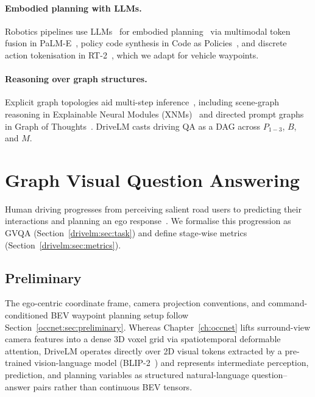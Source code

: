 \paragraph{Embodied planning with LLMs.}
Robotics pipelines use LLMs~\cite{touvron2023llama,floridi2020gpt,kojima2022large} for embodied planning~\cite{brohan2023can,huang2022inner,zitkovich2023rt2,driess2023palme,liang2023code,karamcheti2023voltron,rana2023sayplan} via multimodal token fusion in PaLM-E~\cite{driess2023palme}, policy code synthesis in Code as Policies~\cite{liang2023code}, and discrete action tokenisation in RT-2~\cite{zitkovich2023rt2}, which we adapt for vehicle waypoints.

\paragraph{Reasoning over graph structures.}
Explicit graph topologies aid multi-step inference~\cite{chen2020review,shi2019scenegraph,besta2023got,chen2019graph}, including scene-graph reasoning in Explainable Neural Modules (XNMs)~\cite{shi2019scenegraph} and directed prompt graphs in Graph of Thoughts~\cite{besta2023got}. DriveLM casts driving QA as a DAG across $P_{1-3}$, $B$, and $M$.

\section{Graph Visual Question Answering}\label{drivelm:sec:gvqa}

Human driving progresses from perceiving salient road users to predicting their interactions and planning an ego response~\cite{macadam2003understanding,groeger2013understanding}. We formalise this progression as GVQA (Section~\ref{drivelm:sec:task}) and define stage-wise metrics (Section~\ref{drivelm:sec:metrics}).

\subsection{Preliminary}\label{drivelm:sec:prelim}

The ego-centric coordinate frame, camera projection conventions, and command-conditioned BEV waypoint planning setup follow Section~\ref{occnet:sec:preliminary}. Whereas Chapter~\ref{ch:occnet} lifts surround-view camera features into a dense 3D voxel grid via spatiotemporal deformable attention, DriveLM operates directly over 2D visual tokens extracted by a pre-trained vision-language model (BLIP-2~\cite{li2023blip2}) and represents intermediate perception, prediction, and planning variables as structured natural-language question--answer pairs rather than continuous BEV tensors.


